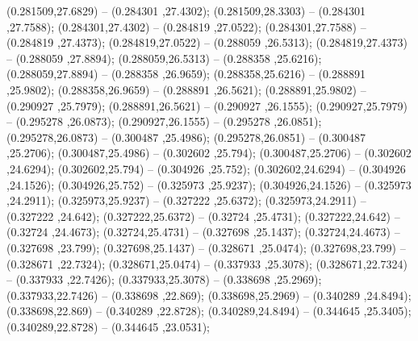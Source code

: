  (0.281509,27.6829) -- (0.284301 ,27.4302);
 (0.281509,28.3303) -- (0.284301 ,27.7588);
 (0.284301,27.4302) -- (0.284819 ,27.0522);
 (0.284301,27.7588) -- (0.284819 ,27.4373);
 (0.284819,27.0522) -- (0.288059 ,26.5313);
 (0.284819,27.4373) -- (0.288059 ,27.8894);
 (0.288059,26.5313) -- (0.288358 ,25.6216);
 (0.288059,27.8894) -- (0.288358 ,26.9659);
 (0.288358,25.6216) -- (0.288891 ,25.9802);
 (0.288358,26.9659) -- (0.288891 ,26.5621);
 (0.288891,25.9802) -- (0.290927 ,25.7979);
 (0.288891,26.5621) -- (0.290927 ,26.1555);
 (0.290927,25.7979) -- (0.295278 ,26.0873);
 (0.290927,26.1555) -- (0.295278 ,26.0851);
 (0.295278,26.0873) -- (0.300487 ,25.4986);
 (0.295278,26.0851) -- (0.300487 ,25.2706);
 (0.300487,25.4986) -- (0.302602 ,25.794);
 (0.300487,25.2706) -- (0.302602 ,24.6294);
 (0.302602,25.794) -- (0.304926 ,25.752);
 (0.302602,24.6294) -- (0.304926 ,24.1526);
 (0.304926,25.752) -- (0.325973 ,25.9237);
 (0.304926,24.1526) -- (0.325973 ,24.2911);
 (0.325973,25.9237) -- (0.327222 ,25.6372);
 (0.325973,24.2911) -- (0.327222 ,24.642);
 (0.327222,25.6372) -- (0.32724 ,25.4731);
 (0.327222,24.642) -- (0.32724 ,24.4673);
 (0.32724,25.4731) -- (0.327698 ,25.1437);
 (0.32724,24.4673) -- (0.327698 ,23.799);
 (0.327698,25.1437) -- (0.328671 ,25.0474);
 (0.327698,23.799) -- (0.328671 ,22.7324);
 (0.328671,25.0474) -- (0.337933 ,25.3078);
 (0.328671,22.7324) -- (0.337933 ,22.7426);
 (0.337933,25.3078) -- (0.338698 ,25.2969);
 (0.337933,22.7426) -- (0.338698 ,22.869);
 (0.338698,25.2969) -- (0.340289 ,24.8494);
 (0.338698,22.869) -- (0.340289 ,22.8728);
 (0.340289,24.8494) -- (0.344645 ,25.3405);
 (0.340289,22.8728) -- (0.344645 ,23.0531);
